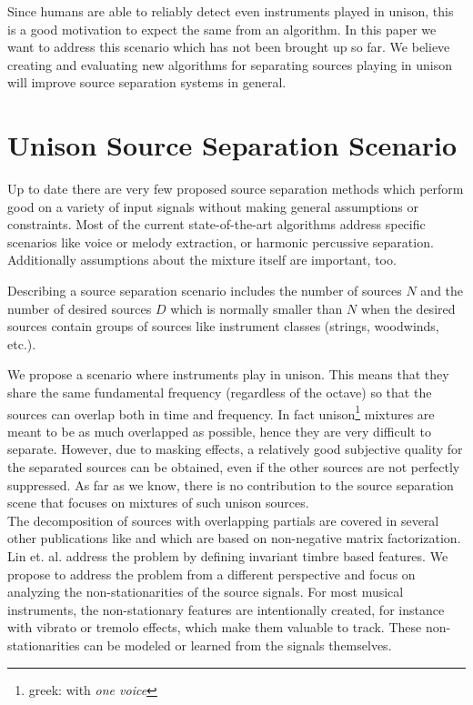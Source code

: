 Since humans are able to reliably detect even instruments played in unison, this is a good motivation to expect the same from an algorithm. In this paper we want to address this scenario which has not been brought up so far. We believe creating and evaluating new algorithms for separating sources playing in unison will improve source separation systems in general.

\section{Unison Source Separation Scenario}
\label{sec:scenario}

Up to date there are very few proposed source separation methods which perform good on a variety of input signals without making general assumptions or constraints. Most of the current state-of-the-art algorithms address specific scenarios like voice or melody extraction, or harmonic percussive separation. Additionally assumptions about the mixture itself are important, too.

Describing a source separation scenario includes the number of sources $N$ and the number of desired sources $D$ which is normally smaller than $N$ when the desired sources contain groups of sources like instrument classes (strings, woodwinds, etc.).

We propose a scenario where instruments play in unison. This means that they share the same fundamental frequency (regardless of the octave) so that the sources can overlap both in time and frequency. In fact unison\footnote{greek: with \emph{one voice}} mixtures are meant to be as much overlapped as possible, hence they are very difficult to separate. However, due to masking effects, a relatively good subjective quality for the separated sources can be obtained, even if the other sources are not perfectly suppressed.
As far as we know, there is no contribution to the source separation scene that focuses on mixtures of such unison sources. \\

The decomposition of sources with overlapping partials are covered in several other publications like \cite{nakano10} and \cite{smaragdis08} which are based on non-negative matrix factorization. Lin et. al. \cite{lintimbre13} address the problem by defining invariant timbre based features. We propose to address the problem from a different perspective and focus on analyzing the non-stationarities of the source signals. For most musical instruments, the non-stationary features are intentionally created, for instance with vibrato or tremolo effects, which make them valuable to track. These non-stationarities can be modeled or learned from the signals themselves. \\

